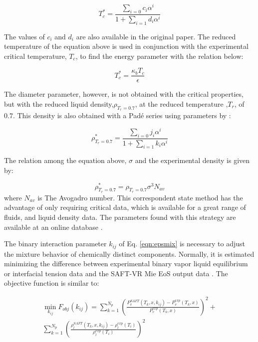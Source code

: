 \begin{equation}
T_{c}^{*} = \frac{\sum_{i=0} c_{i}\alpha^{i}}{1+\sum_{i=1} d_{i}\alpha^{i}}   
\label{eqn:tc}
\end{equation}

The values of $c_{i}$ and $d_{i}$ are also available in the original paper. The reduced temperature of the equation above is used in conjunction with the experimental critical temperature, $ T_{c}$, to find the energy parameter with the relation below:

\begin{equation}
T_{c}^{*} = \frac{\kappa_{b}T_{c}}{\epsilon}   
\label{eqn:epscorre}
\end{equation}

The diameter parameter, however, is not obtained with the critical properties, but with the reduced liquid density,$\rho_{T_{r}=0.7}$, at the reduced temperature ,$T_{r}$, of $0.7$. This density is also obtained with a Padé series using parameters by :

\begin{equation}
\rho_{T_{r}=0.7}^{*} = \frac{\sum_{i=0} j_{i}\alpha^{i}}{1+\sum_{i=1} k_{i}\alpha^{i}} 
\label{eqn:denscorre}
\end{equation}

The relation among the equation above, $\sigma$ and the experimental density is given by:

\begin{equation}
\rho_{T_{r}=0.7}^{*} = \rho_{T_{r}=0.7}\sigma^{3}N_{av}   
\label{eqn:sigmacorre}
\end{equation}
where $N_{av}$ is The Avogadro number. This correspondent state method has the advantage of only requiring critical data, which is available for a great range of fluids, and liquid density data. The parameters found with this strategy are available at an online database \cite{ervik2016}.     

The binary interaction parameter $k_{ij}$ of Eq. \eqref{eqn:epsmix} is necessary to adjust the mixture behavior of chemically distinct components. Normally, it is estimated minimizing the difference between experimental binary vapor liquid equilibrium or interfacial tension data and the SAFT-VR Mie EoS output data \cite{muller2017,lobanova2016}. The objective function is similar to: 

\begin{equation}
\begin{aligned}
\min\limits_{k_{ij}} F_{obj}(k_{ij})= \sum_{k=1}^{N_{p}} \left(\frac{P_{v}^{SAFT}(T_{k},x,k_{ij})-P_{v}^{exp}(T_{k},x)}{P_{v}^{exp}(T_{k},x)} \right)^2 +\\
\sum_{k=1}^{N_{p}} \left(\frac{\rho_{l}^{SAFT}(T_{k},x,k_{ij})-\rho_{l}^{exp}(T_{i})}{\rho_{l}^{exp}(T_{i})} \right)^2
\end{aligned}
\label{eqn:fobjmix}
\end{equation}

